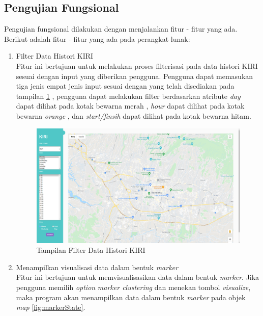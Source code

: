 \subsection{Pengujian Fungsional}
Pengujian fungsional dilakukan dengan menjalankan fitur - fitur yang ada. Berikut adalah fitur - fitur yang ada pada perangkat lunak:
\begin{enumerate}
	\item Filter Data Histori KIRI\\
	Fitur ini bertujuan untuk melakukan proses filterisasi pada data histori KIRI sesuai dengan input yang diberikan pengguna. Pengguna dapat memasukan tiga jenis empat jenis input sesuai dengan yang telah disediakan pada tampilan \ref{fig:filterState} , pengguna dapat melakukan filter berdasarkan atribute \textit{day} dapat dilihat pada kotak bewarna merah   , \textit{hour} dapat dilihat pada kotak bewarna \textit{orange} , dan \textit{start/finsih} dapat dilihat pada kotak bewarna hitam.
	
	\begin{figure}[H]
	\centering  
	\includegraphics[scale=0.3]{Gambar/KIRI-UI.png}  
	\caption[Tampilan Filter Data Histori KIRI]{Tampilan Filter Data Histori KIRI} 
	\label{fig:filterState}
	\end{figure}
	
	\newpage\item Menampilkan visualisasi data dalam bentuk \textit{marker}\\
	Fitur ini bertujuan untuk memvisualisasikan data dalam bentuk \textit{marker}. Jika pengguna memilih \textit{option} \textit{marker clustering} dan menekan tombol \textit{visualize}, maka program akan menampilkan data dalam bentuk \textit{marker} pada objek \textit{map} \ref{fig:markerState}.
	

\end{enumerate}
